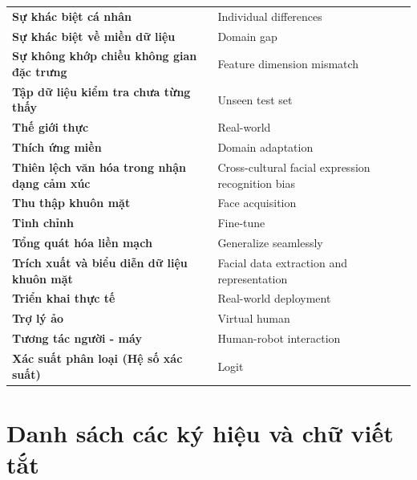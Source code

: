 \begin{longtable}{p{6.5cm} p{8.5cm}}
\textbf{Sự khác biệt cá nhân} & Individual differences \\
\textbf{Sự khác biệt về miền dữ liệu} & Domain gap \\
\textbf{Sự không khớp chiều không gian đặc trưng} & Feature dimension mismatch \\
\textbf{Tập dữ liệu kiểm tra chưa từng thấy} & Unseen test set \\
\textbf{Thế giới thực} & Real-world \\
\textbf{Thích ứng miền} & Domain adaptation \\
\textbf{Thiên lệch văn hóa trong nhận dạng cảm xúc} & Cross-cultural facial expression recognition bias \\
\textbf{Thu thập khuôn mặt} & Face acquisition \\
\textbf{Tinh chỉnh} & Fine-tune \\
\textbf{Tổng quát hóa liền mạch} & Generalize seamlessly \\
\textbf{Trích xuất và biểu diễn dữ liệu khuôn mặt} & Facial data extraction and representation \\
\textbf{Triển khai thực tế} & Real-world deployment \\
\textbf{Trợ lý ảo} & Virtual human \\
\textbf{Tương tác người - máy} & Human-robot interaction \\
\textbf{Xác suất phân loại (Hệ số xác suất)} & Logit \\

\end{longtable}

\pagebreak
\section*{Danh sách các ký hiệu và chữ viết tắt}

\renewcommand{\arraystretch}{1.3} 

